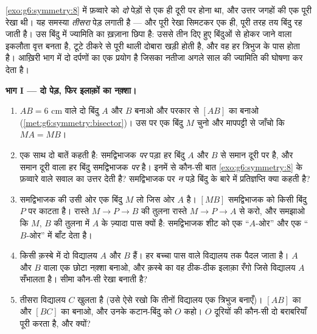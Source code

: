 \begin{problem}
\label{pb:g6:symmetry:1}
\cref{exo:g6:symmetry:8} में फ़व्वारे को \emph{दो} पेड़ों से एक ही
दूरी पर होना था, और उत्तर जगहों की एक पूरी रेखा थी। यह समस्या
\emph{तीसरा} पेड़ लगाती है --- और पूरी रेखा सिमटकर एक ही, पूरी
तरह तय बिंदु रह जाती है। उस बिंदु में ज्यामिति का ख़ज़ाना छिपा
है: उससे तीन दिए हुए बिंदुओं से होकर जाने वाला इकलौता वृत्त बनता
है, टूटे ठीकरे से पूरी थाली दोबारा खड़ी होती है, और वह हर त्रिभुज
के पास होता है। आख़िरी भाग में दो दर्पणों का एक प्रयोग है जिसका
नतीजा अगले साल की ज्यामिति की घोषणा कर देता है।

\medskip
\noindent\textbf{भाग I --- दो पेड़, फिर इलाक़ों का
नक़्शा।}
\begin{enumerate}
  \item $AB = 6$ cm वाले दो बिंदु $A$ और $B$ बनाओ और परकार से
        $[AB]$ का  बनाओ
        (\cref{met:g6:symmetry:bisector})। उस पर एक बिंदु
        $M$ चुनो और मापपट्टी से जाँचो कि $MA = MB$।
  \item {} एक साथ दो बातें कहती
        है: समद्विभाजक \emph{पर} पड़ा हर बिंदु $A$ और $B$ से
        समान दूरी पर है, और समान दूरी वाला हर बिंदु
        समद्विभाजक \emph{पर} है। इनमें से कौन-सी बात
        \cref{exo:g6:symmetry:8} के फ़व्वारे वाले सवाल का उत्तर
        देती है? समद्विभाजक पर \emph{न} पड़े बिंदु के बारे में
        प्रतिज्ञप्ति क्या कहती है?
  \item समद्विभाजक की उसी ओर एक बिंदु $M$ लो जिस ओर $A$ है।
         $[MB]$ समद्विभाजक को किसी बिंदु $P$ पर काटता
        है। रास्ते $M \to P \to B$ की तुलना रास्ते
        $M \to P \to A$ से करो, और समझाओ कि $M$, $B$ की तुलना
        में $A$ के ज़्यादा पास क्यों है: समद्विभाजक शीट को एक
        ``$A$-ओर'' और एक ``$B$-ओर'' में बाँट देता है।
  \item किसी क़स्बे में दो विद्यालय $A$ और $B$ हैं। हर बच्चा पास
        वाले विद्यालय तक पैदल जाता है। $A$ और $B$ वाला एक छोटा
        नक़्शा बनाओ, और क़स्बे का वह ठीक-ठीक इलाक़ा रँगो जिसे
        विद्यालय $A$ सँभालता है। सीमा कौन-सी रेखा बनाती है?
  \item तीसरा विद्यालय $C$ खुलता है (उसे ऐसे रखो कि तीनों
        विद्यालय एक त्रिभुज बनाएँ)। $[AB]$ का  और
        $[BC]$ का  बनाओ, और उनके कटान-बिंदु को
        $O$ कहो। $O$ दूरियों की कौन-सी दो बराबरियाँ पूरी करता
        है, और क्यों?
\end{enumerate}


\end{problem}
